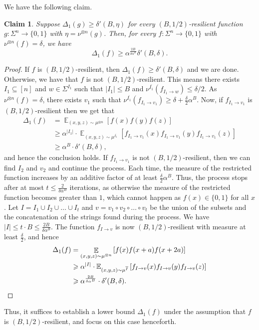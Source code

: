 \documentclass[11pt]{article}
\newtheorem{claim}[thm]{Claim}
\newcommand\E{\mathbb{E}}
\newcommand\Expect[2]{{\mathop{\mathbb{E}}_{#1}\left[ {#2} \right]}}
\renewcommand\geq{\geqslant}
\renewcommand\leq{\leqslant}
\newcommand{\V}[1]{{#1}}
\begin{document}
We have the following claim.
\begin{claim}\label{claim:making_f_resilient}
    Suppose $\Delta_1(g) \geq \delta'(B, \eta)$ for every $(B,1/2)$-resilient function $g: \Sigma^n \rightarrow \{0,1\}$ with $\eta =\nu^{\otimes n}(g)$. Then, for every $f: \Sigma^n \rightarrow \{0,1\}$ with $\nu^{\otimes n}(f) = \delta$, we have
    $$\Delta_1(f)\geq  \alpha^{\frac{2B}{\delta\alpha^B}}\delta'(B, \delta).$$ 
\end{claim}
\begin{proof}
If $f$ is $(B, 1/2)$-resilient, then $\Delta_1(f)\geq \delta'(B, \delta)$ and we are done. Otherwise, we have that $f$ is not $(B, 1/2)$-resilient. This means there exists $I_1\subseteq [n]$ and $w\in \Sigma^{I_1}$ such that $|I_1|\leq B$ and $\nu^{\bar{I_1}}(f_{I_1\rightarrow w}) \leq \delta/2$. As $\nu^{\otimes n}(f) = \delta$, there exists $v_1$ such that $\nu^{\bar{I_1}}(f_{I_1\rightarrow v_1}) \geq \delta + \frac{\delta}{2}\alpha^{B}$. Now, if $f_{I_1\rightarrow v_1}$ is $(B, 1/2)$-resilient then we get that 
\begin{align*}
    \Delta_1(f) &= \Expect{(\V x, \V y, \V z)\sim \mu^{\otimes n}}{f(\V x) f(\V y) f(\V z)}\\
    & \geq \alpha^{|I_1|}\cdot  \Expect{(\V x, \V y, \V z)\sim \mu^{\overline{I_1}}}{ f_{I_1\rightarrow v_1}(\V x) f_{I_1\rightarrow v_1}(\V y) f_{I_1\rightarrow v_1}(\V z)}\\
    &\geq \alpha^{B}\cdot \delta'(B, \delta),
\end{align*}
and hence the conclusion holds. If $f_{I_1\rightarrow v_1}$ is not $(B, 1/2)$-resilient, then we can find $I_2$ and $v_2$ and continue the process. Each time, the measure of the restricted function increases by an additive factor of at least $\frac{\delta}{2}\alpha^B$. Thus, the process stops after at most $t\leq \frac{2}{\delta\alpha^B}$ iterations, as otherwise the measure of the restricted function becomes greater than $1$, which cannot happen as $f(\V x)\in \{0,1\}$ for all $\V x$. Let $I = I_1\cup I_2\cup \ldots \cup I_t$ and $v=v_1\circ v_2\circ \ldots \circ v_t$ be the union of the subsets and the concatenation of the strings found during the process. We have $|I|\leq t\cdot B \leq  \frac{2B}{\delta\alpha^B}$. The function $f_{I\rightarrow v}$ is now $(B, 1/2)$-resilient with measure at least $\frac{\delta}{2}$, and hence
\begin{align*}
    \Delta_1(f) &= \Expect{(\V x, \V y, \V z)\sim \mu^{\otimes n}}{f(\V x) f(\V x+\V a) f(\V x+2\V a)}\\
    & \geq \alpha^{|I|}\cdot \E_{(\V x, \V y, \V z)\sim \mu^{\overline{I}}}\left[ f_{I\rightarrow v}(\V x) f_{I\rightarrow v}(\V y) f_{I\rightarrow v}(\V z)\right]\\
    &\geq \alpha^{\frac{2B}{\delta\alpha^B}}\cdot \delta'(B, \delta).
    \qedhere
\end{align*}
\end{proof}
Thus, it suffices to establish a lower bound $\Delta_1(f)$ under the assumption that $f$ is $(B, 1/2)$-resilient, and focus on this case henceforth.
\end{document}
